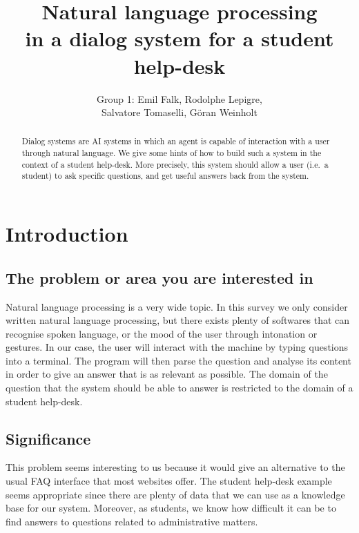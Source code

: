 \documentclass[a4paper,11pt]{article}
\begin{document}
\title{Natural language processing\\
in a dialog system for a student help-desk}
\author{Group 1: Emil Falk, Rodolphe Lepigre,\\
        Salvatore Tomaselli, G\"oran Weinholt}
\maketitle
\begin{abstract}\centering
Dialog systems are AI systems in which an agent is capable of interaction with
a user through natural language. We give some hints of how to build such a
system in the context of a student help-desk. More precisely, this system
should allow a user (i.e.~a student) to ask specific questions, and get
useful answers back from the system.
\end{abstract}

\section{Introduction}
\subsection{The problem or area you are interested in}
Natural language processing is a very wide topic. In this survey we only
consider written natural language processing, but there exists plenty of
softwares that can recognise spoken language, or the mood of the user through
intonation or gestures. In our case, the user will interact with the machine
by typing questions into a terminal. The program will then parse the question
and analyse its content in order to give an answer that is as relevant as
possible. The domain of the question that the system should be able to
answer is restricted to the domain of a student help-desk.

\subsection{Significance}
This problem seems interesting to us because it would give an alternative to
the usual FAQ interface that most websites offer. The student help-desk example
seems appropriate since there are plenty of data that we can use as a knowledge
base for our system. Moreover, as students, we know how difficult it can be
to find answers to questions related to administrative matters.
\end{document}
